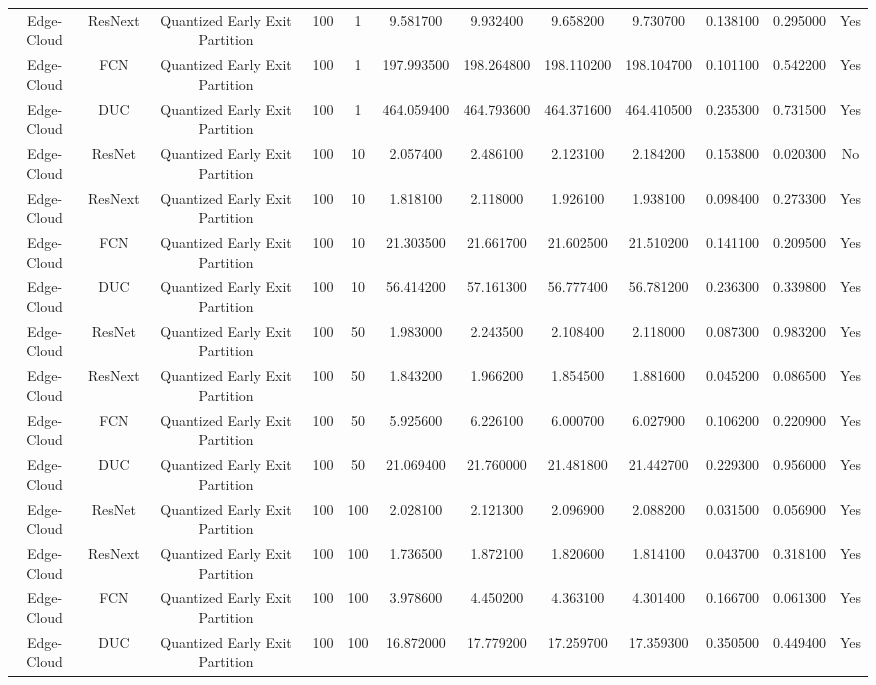 \begin{tabular}{|c||c||c||c||c||c||c||c||c||c||c||c|}
Edge-Cloud & ResNext & Quantized Early Exit Partition & 100 & 1 & 9.581700 & 9.932400 & 9.658200 & 9.730700 & 0.138100 & 0.295000 & Yes \\
Edge-Cloud & FCN & Quantized Early Exit Partition & 100 & 1 & 197.993500 & 198.264800 & 198.110200 & 198.104700 & 0.101100 & 0.542200 & Yes \\
Edge-Cloud & DUC & Quantized Early Exit Partition & 100 & 1 & 464.059400 & 464.793600 & 464.371600 & 464.410500 & 0.235300 & 0.731500 & Yes \\
Edge-Cloud & ResNet & Quantized Early Exit Partition & 100 & 10 & 2.057400 & 2.486100 & 2.123100 & 2.184200 & 0.153800 & 0.020300 & No \\
Edge-Cloud & ResNext & Quantized Early Exit Partition & 100 & 10 & 1.818100 & 2.118000 & 1.926100 & 1.938100 & 0.098400 & 0.273300 & Yes \\
Edge-Cloud & FCN & Quantized Early Exit Partition & 100 & 10 & 21.303500 & 21.661700 & 21.602500 & 21.510200 & 0.141100 & 0.209500 & Yes \\
Edge-Cloud & DUC & Quantized Early Exit Partition & 100 & 10 & 56.414200 & 57.161300 & 56.777400 & 56.781200 & 0.236300 & 0.339800 & Yes \\
Edge-Cloud & ResNet & Quantized Early Exit Partition & 100 & 50 & 1.983000 & 2.243500 & 2.108400 & 2.118000 & 0.087300 & 0.983200 & Yes \\
Edge-Cloud & ResNext & Quantized Early Exit Partition & 100 & 50 & 1.843200 & 1.966200 & 1.854500 & 1.881600 & 0.045200 & 0.086500 & Yes \\
Edge-Cloud & FCN & Quantized Early Exit Partition & 100 & 50 & 5.925600 & 6.226100 & 6.000700 & 6.027900 & 0.106200 & 0.220900 & Yes \\
Edge-Cloud & DUC & Quantized Early Exit Partition & 100 & 50 & 21.069400 & 21.760000 & 21.481800 & 21.442700 & 0.229300 & 0.956000 & Yes \\
Edge-Cloud & ResNet & Quantized Early Exit Partition & 100 & 100 & 2.028100 & 2.121300 & 2.096900 & 2.088200 & 0.031500 & 0.056900 & Yes \\
Edge-Cloud & ResNext & Quantized Early Exit Partition & 100 & 100 & 1.736500 & 1.872100 & 1.820600 & 1.814100 & 0.043700 & 0.318100 & Yes \\
Edge-Cloud & FCN & Quantized Early Exit Partition & 100 & 100 & 3.978600 & 4.450200 & 4.363100 & 4.301400 & 0.166700 & 0.061300 & Yes \\
Edge-Cloud & DUC & Quantized Early Exit Partition & 100 & 100 & 16.872000 & 17.779200 & 17.259700 & 17.359300 & 0.350500 & 0.449400 & Yes \\

\end{tabular}
